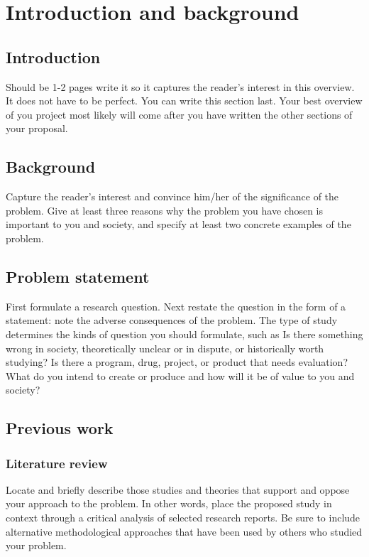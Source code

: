 \chapter{Introduction and background}

\section{Introduction}
Should be 1-2 pages
write it so it captures the reader's interest in this overview. It does not have to be perfect.
You can write this section last. Your best overview of you project most likely will come after you have written the other sections of your proposal.

\section{Background}
Capture the reader's interest and convince him/her of the significance of the problem.
Give at least three reasons why the problem you have chosen is important to you and society, and specify at least two concrete examples of the problem.

\section{Problem statement}
First formulate a research question. Next restate the question in the form of a statement: note the adverse consequences of the problem.
The type of study determines the kinds of question you should formulate, such as Is there something wrong in society, theoretically unclear or in dispute, or historically worth studying? Is there a program, drug, project, or product that needs evaluation? What do you intend to create or produce and how will it be of value to you and society?

\section{Previous work}

\subsection{Literature review}
Locate and briefly describe those studies and theories that support and oppose your approach to the problem. In other words, place the proposed study in context through a critical analysis of selected research reports.
Be sure to include alternative methodological approaches that have been used by others who studied your problem.

